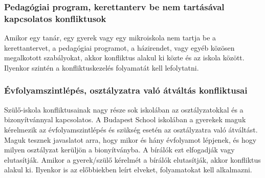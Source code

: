 \subsubsection{Pedagógiai program, kerettanterv be nem tartásával kapcsolatos konfliktusok}

Amikor egy tanár, egy gyerek vagy egy mikroiskola nem tartja be a kerettantervet, a pedagógiai programot, a házirendet, vagy egyéb közösen megalkotott szabályokat, akkor konfliktus alakul ki közte és az iskola között. Ilyenkor szintén a konfliktuskezelés folyamatát kell lefolytatni.

\subsubsection{Évfolyamszintlépés, osztályzatra való átváltás konfliktusai}
Szülő-iskola konfliktusainak nagy része sok iskolában az osztályzatokkal és a bizonyítvánnyal kapcsolatos. A Budapest School iskolában a gyerekek maguk kérelmezik az évfolyamszintlépés és szükség esetén az osztályzatra való átváltást. Maguk tesznek javaslatot arra, hogy mikor és hány évfolyamot lépjenek, és hogy milyen osztályzat kerüljön a bionyítványba. A bírálók ezt elfogadják vagy elutasítják. Amikor a gyerek/szülő kérelmét a bírálók elutasítják, akkor konfliktus alakul ki. Ilyenkor is az előbbiekben leírt elveket, folyamatokat kell alkalmazni.